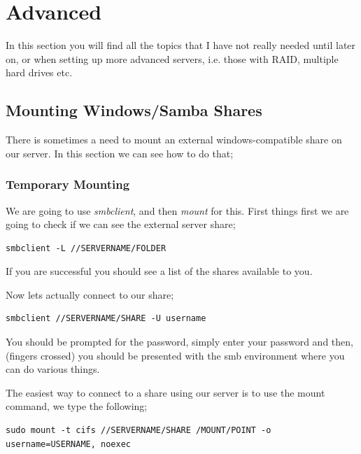 \chapter{Advanced}
\label{chp:adv_basic}


In this section you will find all the topics that I have not really needed until later on, or when setting up more advanced servers, i.e. those with RAID, multiple hard drives etc.

\section{Mounting Windows/Samba Shares}
\label{sec:mount_samba}

There is sometimes a need to mount an external windows-compatible share on our server.  In this section we can see how to do that;

\subsection{Temporary Mounting}

We are going to use \textit{smbclient}, and then \textit{mount} for this.  First things first we are going to check if we can see the external server share;

\begin{lstlisting}
smbclient -L //SERVERNAME/FOLDER
\end{lstlisting}

If you are successful you should see a list of the shares available to you.

Now lets actually connect to our share;

\begin{lstlisting}
smbclient //SERVERNAME/SHARE -U username
\end{lstlisting}

You should be prompted for the password, simply enter your password and then, (fingers crossed) you should be presented with the smb environment where you can do various things.

The easiest way to connect to a share using our server is to use the mount command, we type the following;

\begin{lstlisting}
sudo mount -t cifs //SERVERNAME/SHARE /MOUNT/POINT -o username=USERNAME, noexec
\end{lstlisting}

